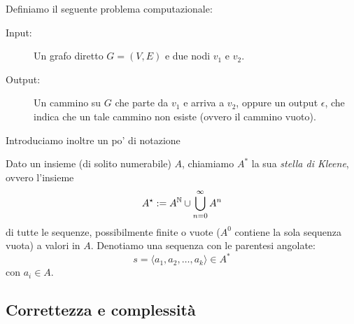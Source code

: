 \documentclass[11pt]{scrartcl}
\begin{document}
	\begin{example}
		Definiamo il seguente problema computazionale:
		\begin{description}
			\item[Input:] Un grafo diretto $G=(V,E)$ e due nodi $v_1$ e $v_2$.
			\item[Output:] Un cammino su $G$ che parte da $v_1$ e arriva a $v_2$, oppure un output $\epsilon$, che indica che un tale cammino non esiste (ovvero il cammino vuoto).
		\end{description}
	\end{example}
	Introduciamo inoltre un po' di notazione
	\begin{definition}
		Dato un insieme (di solito numerabile) $A$, chiamiamo $A^*$ la sua \textit{stella di Kleene}, ovvero l'insieme
		$$A^\star:=A^{\mathbb N}\cup \bigcup_{n=0}^\infty A^n$$
		di tutte le sequenze, possibilmente finite o vuote ($A^0$ contiene la sola sequenza vuota) a valori in $A$. Denotiamo una sequenza con le parentesi angolate:
		$$s=\langle a_1,a_2,\dots,a_k\rangle \in A^*$$
		con $a_i\in A$.
	\end{definition}
	
	\subsection{Correttezza e complessità}
	
\end{document}
